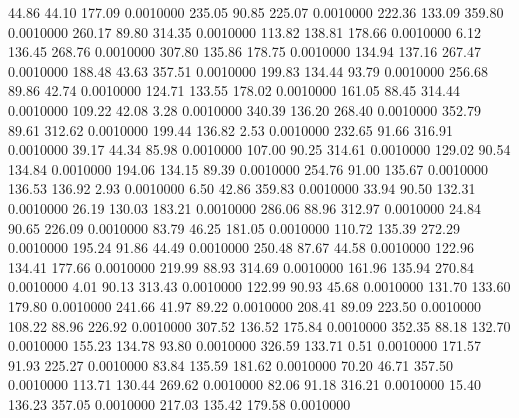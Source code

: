   44.86   44.10  177.09   0.0010000
 235.05   90.85  225.07   0.0010000
 222.36  133.09  359.80   0.0010000
 260.17   89.80  314.35   0.0010000
 113.82  138.81  178.66   0.0010000
   6.12  136.45  268.76   0.0010000
 307.80  135.86  178.75   0.0010000
 134.94  137.16  267.47   0.0010000
 188.48   43.63  357.51   0.0010000
 199.83  134.44   93.79   0.0010000
 256.68   89.86   42.74   0.0010000
 124.71  133.55  178.02   0.0010000
 161.05   88.45  314.44   0.0010000
 109.22   42.08    3.28   0.0010000
 340.39  136.20  268.40   0.0010000
 352.79   89.61  312.62   0.0010000
 199.44  136.82    2.53   0.0010000
 232.65   91.66  316.91   0.0010000
  39.17   44.34   85.98   0.0010000
 107.00   90.25  314.61   0.0010000
 129.02   90.54  134.84   0.0010000
 194.06  134.15   89.39   0.0010000
 254.76   91.00  135.67   0.0010000
 136.53  136.92    2.93   0.0010000
   6.50   42.86  359.83   0.0010000
  33.94   90.50  132.31   0.0010000
  26.19  130.03  183.21   0.0010000
 286.06   88.96  312.97   0.0010000
  24.84   90.65  226.09   0.0010000
  83.79   46.25  181.05   0.0010000
 110.72  135.39  272.29   0.0010000
 195.24   91.86   44.49   0.0010000
 250.48   87.67   44.58   0.0010000
 122.96  134.41  177.66   0.0010000
 219.99   88.93  314.69   0.0010000
 161.96  135.94  270.84   0.0010000
   4.01   90.13  313.43   0.0010000
 122.99   90.93   45.68   0.0010000
 131.70  133.60  179.80   0.0010000
 241.66   41.97   89.22   0.0010000
 208.41   89.09  223.50   0.0010000
 108.22   88.96  226.92   0.0010000
 307.52  136.52  175.84   0.0010000
 352.35   88.18  132.70   0.0010000
 155.23  134.78   93.80   0.0010000
 326.59  133.71    0.51   0.0010000
 171.57   91.93  225.27   0.0010000
  83.84  135.59  181.62   0.0010000
  70.20   46.71  357.50   0.0010000
 113.71  130.44  269.62   0.0010000
  82.06   91.18  316.21   0.0010000
  15.40  136.23  357.05   0.0010000
 217.03  135.42  179.58   0.0010000
